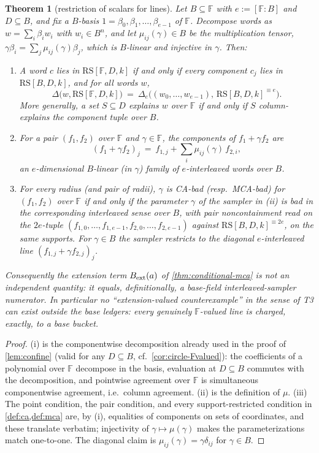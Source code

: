 \documentclass[11pt]{article}
\newtheorem{theorem}{Theorem}[section]
\theoremstyle{definition}
\theoremstyle{remark}
\newcommand{\F}{\mathbb{F}}
\newcommand{\B}{B}
\newcommand{\RS}{\mathrm{RS}}
\newcommand{\dist}{\Delta}
\begin{document}
\begin{theorem}[restriction of scalars for lines]\label{thm:weil-lines}
Let $\B\subseteq\F$ with $e:=[\F:\B]$ and $D\subseteq\B$, and fix a $\B$-basis $1=\beta_0,\beta_1,\dots,\beta_{e-1}$ of $\F$. Decompose words as $w=\sum_i\beta_iw_i$ with $w_i\in\B^n$, and let $\mu_{ij}(\gamma)\in\B$ be the multiplication tensor, $\gamma\beta_i=\sum_j\mu_{ij}(\gamma)\beta_j$, which is $\B$-linear and injective in $\gamma$. Then:
\begin{enumerate}[label=\textup{(\roman*)}]
\item A word $c$ lies in $\RS[\F,D,k]$ if and only if every component $c_j$ lies in $\RS[\B,D,k]$, and for all words $w$,
\[
\dist\bigl(w,\RS[\F,D,k]\bigr)\ =\ \dist_e\bigl((w_0,\dots,w_{e-1}),\,\RS[\B,D,k]^{\equiv e}\bigr).
\]
More generally, a set $S\subseteq D$ explains $w$ over $\F$ if and only if $S$ column-explains the component tuple over $\B$.
\item For a pair $(f_1,f_2)$ over $\F$ and $\gamma\in\F$, the components of $f_1+\gamma f_2$ are
\[
(f_1+\gamma f_2)_j\ =\ f_{1,j}+\sum_{i}\mu_{ij}(\gamma)\,f_{2,i},
\]
an $e$-dimensional $\B$-linear \textup(in $\gamma$\textup) family of $e$-interleaved words over $\B$.
\item For every radius \textup(and pair of radii\textup), $\gamma$ is CA-bad \textup(resp.\ MCA-bad\textup) for $(f_1,f_2)$ over $\F$ if and only if the parameter $\gamma$ of the sampler in \textup{(ii)} is bad in the corresponding interleaved sense over $\B$, with pair noncontainment read on the $2e$-tuple $(f_{1,0},\dots,f_{1,e-1},f_{2,0},\dots,f_{2,e-1})$ against $\RS[\B,D,k]^{\equiv2e}$, on the same supports. For $\gamma\in\B$ the sampler restricts to the diagonal $e$-interleaved line $(f_{1,j}+\gamma f_{2,j})_j$.
\end{enumerate}
Consequently the extension term $B_{\rm ext}(a)$ of \cref{thm:conditional-mca} is not an independent quantity: it equals, definitionally, a base-field interleaved-sampler numerator. In particular no ``extension-valued counterexample'' in the sense of T3 can exist outside the base ledgers: every genuinely $\F$-valued line is charged, exactly, to a base bucket.
\end{theorem}

\begin{proof}
(i) is the componentwise decomposition already used in the proof of \cref{lem:confine} \textup(valid for any $D\subseteq\B$, cf.\ \cref{cor:circle-Fvalued}\textup): the coefficients of a polynomial over $\F$ decompose in the basis, evaluation at $D\subseteq\B$ commutes with the decomposition, and pointwise agreement over $\F$ is simultaneous componentwise agreement, i.e.\ column agreement. (ii) is the definition of $\mu$. (iii) The point condition, the pair condition, and every support-restricted condition in \cref{def:ca,def:mca} are, by (i), equalities of components on sets of coordinates, and these translate verbatim; injectivity of $\gamma\mapsto\mu(\gamma)$ makes the parameterizations match one-to-one. The diagonal claim is $\mu_{ij}(\gamma)=\gamma\delta_{ij}$ for $\gamma\in\B$.
\end{proof}
\end{document}
